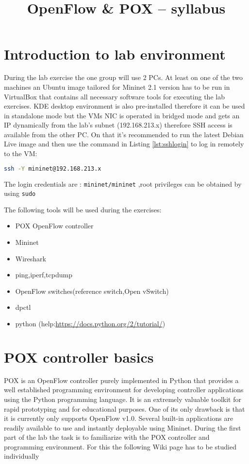 \documentclass[a4paper]{article}
\title{OpenFlow \& POX – syllabus}
\author{}
\date{}
\begin{document}
\maketitle

\tableofcontents

\section{Introduction to lab environment}

During the lab exercise the one group will use 2 PCs. At least on one of the two machines an Ubuntu image tailored for Mininet 2.1 version has to be run in VirtualBox that contains
all necessary software tools for executing the lab exercises. KDE desktop environment is also pre-installed therefore it can be used in standalone mode but the VMs NIC is operated in 
bridged mode and gets an IP dynamically from the lab's subnet (192.168.213.x) therefore SSH access is available from the other PC. On that it's recommended to run the latest Debian Live
image and then use the command in Listing \ref{lst:sshlogin} to log in remotely to the VM:

\begin{lstlisting}[language=bash,frame=single,breaklines,caption={SSH login command},label=lst:sshlogin]
ssh -Y mininet@192.168.213.x
\end{lstlisting}

The login credentials are : \verb!mininet/mininet! ,root privileges can be obtained by using \verb!sudo!

The following tools will be used during the exercises:
\begin{itemize}
\item POX OpenFlow controller
\item Mininet
\item Wireshark
\item ping,iperf,tcpdump
\item OpenFlow switches(reference switch,Open vSwitch)
\item dpctl
\item python (help:\url{https://docs.python.org/2/tutorial/})
\end{itemize}

\section{POX controller basics}

POX is an OpenFlow controller purely implemented in Python that provides a well established programming environment for developing controller applications using the Python programming
language. It is an extremely valuable toolkit for rapid prototyping and for educational purposes. One of its only drawback is that it is currently only supports OpenFlow v1.0. Several built-in applications are 
readily available to use and instantly deployable using Mininet. During the first part of the lab the task
is to familiarize with the POX controller and programming environment. For this the following Wiki page has to be studied individually
\end{document}
